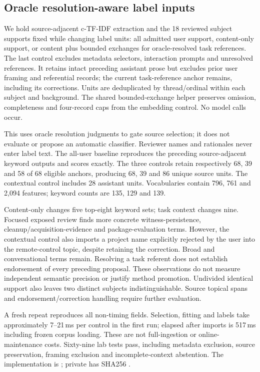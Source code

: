 \documentclass[11pt]{article}
\begin{document}
\subsection{Oracle resolution-aware label inputs}
We hold source-adjacent c-TF-IDF extraction and the 18 reviewed subject supports
fixed while changing label units: all admitted user support, content-only support,
or content plus bounded exchanges for oracle-resolved task references. The last
control excludes metadata selectors, interaction prompts and unresolved references.
It retains intact preceding assistant prose but excludes prior user framing and
referential records; the current task-reference anchor remains, including its
corrections. Units are deduplicated by thread/ordinal within each subject and
background. The shared bounded-exchange helper preserves omission, completeness
and four-record caps from the embedding control. No model calls occur.

This uses oracle resolution judgments to gate source selection; it does not
evaluate or propose an automatic classifier. Reviewer names and rationales never
enter label text. The all-user baseline reproduces the preceding source-adjacent
keyword outputs and scores exactly. The three controls retain respectively
68, 39 and 58 of 68 eligible anchors, producing 68, 39 and 86 unique source units.
The contextual control includes 28 assistant units. Vocabularies contain
796, 761 and 2,094 features; keyword counts are 135, 129 and 139.

Content-only changes five top-eight keyword sets; task context changes nine.
Focused exposed review finds more concrete witness-persistence,
cleanup/acquisition-evidence and package-evaluation terms. However, the contextual
control also imports a project name explicitly rejected by the user into the
remote-control topic, despite retaining the correction. Broad and conversational
terms remain. Resolving a task referent does not establish endorsement of every
preceding proposal. These observations do not measure independent semantic
precision or justify method promotion. Undivided identical support also leaves
two distinct subjects indistinguishable. Source topical spans and
endorsement/correction handling require further evaluation.

A fresh repeat reproduces all non-timing fields. Selection, fitting and labels
take approximately 7--21\,ms per control in the first run; elapsed after imports
is 517\,ms including frozen corpus loading. These are not full-ingestion or
online-maintenance costs. Sixty-nine lab tests pass, including metadata exclusion,
source preservation, framing exclusion and incomplete-context abstention.
The implementation is ; private
 has SHA256
.
\end{document}
